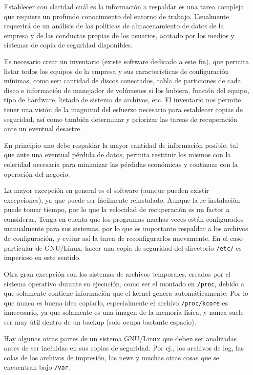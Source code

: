 \documentclass[12pt]{article}
\begin{document}
Establecer con claridad cuál es la información a respaldar es una tarea 
compleja que requiere un profundo conocimiento del entorno de trabajo. 
Usualmente requerirá de un análisis de las políticas de almacenamiento 
de datos de la empresa y de las conductas propias de los usuarios, acotado
por los medios y sistemas de copia de seguridad disponibles.  

Es necesario crear un inventario (existe software dedicado a este fin), que
permita listar todos los equipos de la empresa y sus características de 
configuración mínimas, como ser: cantidad de discos conectados, tabla de
particiones de cada disco e información de manejador de volúmenes si los 
hubiera, función del equipo, tipo de hardware, listado de sistema de 
archivos, etc. El inventario nos permite tener una visión de la magnitud
del esfuerzo necesario para establecer copias de seguridad, así como 
también determinar y priorizar las tareas de recuperación ante un eventual
desastre. 

En principio uno debe respaldar la mayor cantidad de información posible, 
tal que ante una eventual pérdida de datos, permita restituir los mismos 
con la celeridad necesaria para minimizar las pérdidas económicas y 
continuar con la operación del negocio. 

La mayor excepción en general es el software (aunque pueden existir 
excepciones), ya que puede ser fácilmente reinstalado. Aunque la 
re-instalación puede tomar tiempo, por lo que la velocidad de recuperación
es un factor a considerar. 
Tenga en cuenta que los programas muchas veces están configurados 
manualmente para sus sistemas, por lo que es importante respaldar a los 
archivos de configuración, y evitar así la tarea de reconfigurarlos 
nuevamente. En el caso particular de GNU/Linux, hacer una copia de
seguridad del directorio {\tt /etc/} es imperioso en este sentido.

Otra gran excepción son los sistemas de archivos temporales, creados por 
el sistema operativo durante su ejecución, como ser el montado en 
\texttt{/proc}, debido a que solamente contiene información que el kernel
genera automáticamente. Por lo que nunca es buena idea copiarlo, 
especialmente el archivo \texttt{/proc/kcore} es innecesario, ya que 
solamente es una imagen de la memoria física, y nunca suele ser muy útil 
dentro de un backup (solo ocupa bastante espacio).
	
Hay algunas otras partes de un sistema GNU/Linux que deben ser analizadas
 antes de ser incluidas en sus copias de seguridad. Por ej., los archivos 
de log, las colas de los archivos de impresión, las news y muchas otras 
cosas que se encuentran bajo \texttt{/var}. 
\end{document}
